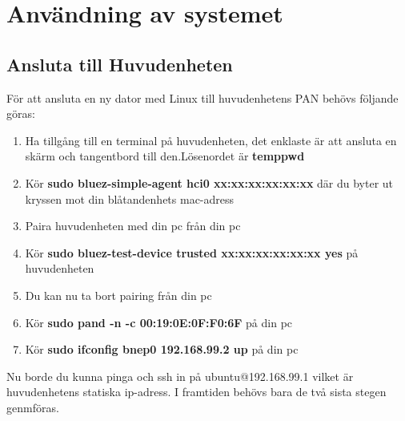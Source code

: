 \section{Användning av systemet}

\subsection{Ansluta till Huvudenheten}
För att ansluta en ny dator med Linux till huvudenhetens PAN behövs följande göras:
\begin{enumerate}
	\item Ha tillgång till en terminal på huvudenheten, det enklaste är att ansluta en skärm och tangentbord till den.\newline Lösenordet är \textbf{temppwd}
	\item Kör \textbf{sudo bluez-simple-agent hci0 xx:xx:xx:xx:xx:xx} där du byter ut kryssen mot din blåtandenhets mac-adress
	\item Paira huvudenheten med din pc från din pc
	\item Kör \textbf{sudo bluez-test-device trusted xx:xx:xx:xx:xx:xx yes} på huvudenheten
	\item Du kan nu ta bort pairing från din pc
	\item Kör \textbf{sudo pand -n -c 00:19:0E:0F:F0:6F	} på din pc
	\item Kör \textbf{sudo ifconfig bnep0 192.168.99.2 up } på din pc
\end{enumerate}
Nu borde du kunna pinga och ssh in på ubuntu@192.168.99.1 vilket är huvudenhetens statiska ip-adress. I framtiden behövs bara de två sista stegen genmföras.
